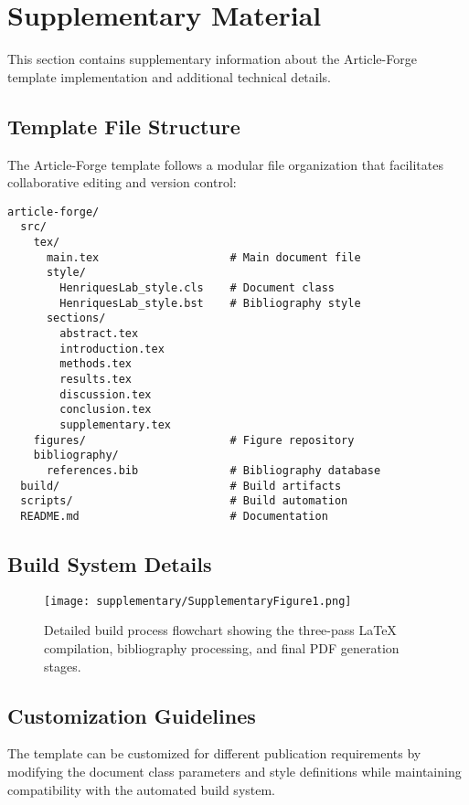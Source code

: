 \section{Supplementary Material}

This section contains supplementary information about the Article-Forge template implementation and additional technical details.

\subsection{Template File Structure}

The Article-Forge template follows a modular file organization that facilitates collaborative editing and version control:

\begin{verbatim}
article-forge/
  src/
    tex/
      main.tex                    # Main document file
      style/
        HenriquesLab_style.cls    # Document class
        HenriquesLab_style.bst    # Bibliography style
      sections/
        abstract.tex
        introduction.tex
        methods.tex
        results.tex
        discussion.tex
        conclusion.tex
        supplementary.tex
    figures/                      # Figure repository
    bibliography/
      references.bib              # Bibliography database
  build/                          # Build artifacts
  scripts/                        # Build automation
  README.md                       # Documentation
\end{verbatim}

\subsection{Build System Details}

\begin{figure}[htbp]
    \centering
    \texttt{[image: supplementary/SupplementaryFigure1.png]}
    \caption{Detailed build process flowchart showing the three-pass LaTeX compilation, bibliography processing, and final PDF generation stages.}
    \label{fig:supp1}
\end{figure}

\subsection{Customization Guidelines}

The template can be customized for different publication requirements by modifying the document class parameters and style definitions while maintaining compatibility with the automated build system.
